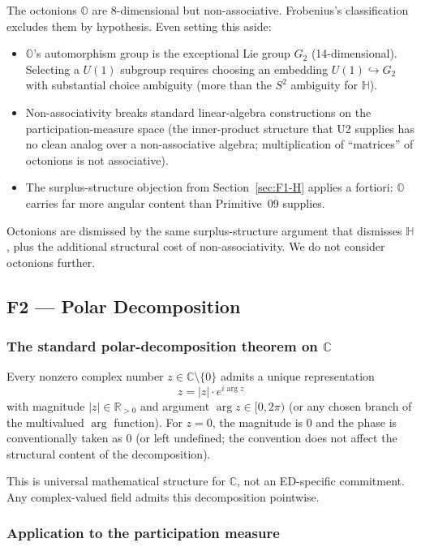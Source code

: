 \documentclass[11pt,a4paper]{article}
\begin{document}
The octonions $\mathbb{O}$ are 8-dimensional but non-associative. Frobenius's classification excludes them by hypothesis. Even setting this aside:
\begin{itemize}
  \item $\mathbb{O}$'s automorphism group is the exceptional Lie group $G_2$ (14-dimensional). Selecting a $U(1)$ subgroup requires choosing an embedding $U(1) \hookrightarrow G_2$ with substantial choice ambiguity (more than the $S^2$ ambiguity for $\mathbb{H}$).
  \item Non-associativity breaks standard linear-algebra constructions on the participation-measure space (the inner-product structure that U2 supplies has no clean analog over a non-associative algebra; multiplication of ``matrices'' of octonions is not associative).
  \item The surplus-structure objection from Section~\ref{sec:F1-H} applies a fortiori: $\mathbb{O}$ carries far more angular content than Primitive~09 supplies.
\end{itemize}
Octonions are dismissed by the same surplus-structure argument that dismisses $\mathbb{H}$, plus the additional structural cost of non-associativity. We do not consider octonions further.

\subsection{F2 --- Polar Decomposition}\label{sec:F2}

\subsubsection{The standard polar-decomposition theorem on $\mathbb{C}$}

Every nonzero complex number $z \in \mathbb{C} \setminus \{0\}$ admits a unique representation
\[
z = |z| \cdot e^{i \arg z}
\]
with magnitude $|z| \in \mathbb{R}_{> 0}$ and argument $\arg z \in [0, 2\pi)$ (or any chosen branch of the multivalued $\arg$ function). For $z = 0$, the magnitude is 0 and the phase is conventionally taken as $0$ (or left undefined; the convention does not affect the structural content of the decomposition).

This is universal mathematical structure for $\mathbb{C}$, not an ED-specific commitment. Any complex-valued field admits this decomposition pointwise.

\subsubsection{Application to the participation measure}
\end{document}
